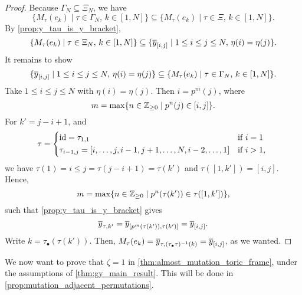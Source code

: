 \begin{proof}
	Because $\Gamma_N \subseteq \Xi_N$, we have
	\begin{equation*}
		\{M_\tau(e_k) \mid \tau \in \Gamma_N,\, k \in [1, N]\}
		\subseteq \{M_\tau(e_k) \mid \tau \in \Xi,\, k \in [1, N]\}.
	\end{equation*}
	By \cref{prop:y_tau_is_y_bracket},
	\begin{equation*}
		\{M_\tau(e_k) \mid \tau \in \Xi_N,\, k \in [1, N]\} \subseteq
		\{\overline{y}_{[i,j]} \mid 1 \leq i \leq j \leq N, \, \eta(i) = \eta(j)\}.
	\end{equation*}
	It remains to show
	\begin{equation*}
		\{\overline{y}_{[i,j]} \mid 1 \leq i \leq j \leq N, \, \eta(i) = \eta(j)\} \subseteq
		\{M_\tau(e_k) \mid \tau \in \Gamma_N,\, k \in [1, N]\}.
	\end{equation*}
	Take $1 \leq i \leq j \leq N$ with $\eta(i) = \eta(j)$. Then $i = p^m(j)$, where
	\begin{equation*}
		m = \max \{n \in \mathbb{Z}_{\geq 0} \mid p^n(j) \in [i, j]\}.
	\end{equation*}
	For $k' = j - i + 1$, and
	\begin{equation*}
		\tau = \begin{dcases*}
			\id = \tau_{1,1}                                                & if $i=1$    \\
			\tau_{i-1,j} = [i, \dots, j, i-1, j+1, \dots, N, i-2, \dots, 1] & if $i > 1$,
		\end{dcases*}
	\end{equation*}
	we have $\tau(1) = i \leq j = \tau(j - i + 1) = \tau(k')$ and $\tau([1, k']) = [i, j]$.
	Hence,
	\begin{equation*}
		m = \max\{n \in \mathbb{Z}_{\geq 0} \mid p^n(\tau(k')) \in \tau([1, k'])\},
	\end{equation*}
	such that \cref{prop:y_tau_is_y_bracket} gives
	\begin{equation*}
		\overline{y}_{\tau, k'} = \overline{y}_{[p^m(\tau(k')), \tau(k')]} = \overline{y}_{[i, j]}.
	\end{equation*}
	Write $k = \tau_\bullet(\tau(k'))$. Then, $M_\tau(e_k) = \overline{y}_{\tau,
			(\tau_\bullet\tau)^{-1}(k)} = \overline{y}_{[i,j]}$, as we wanted.
\end{proof}

We now want to prove that $\zeta = 1$ in \cref{thm:almost_mutation_toric_frame}, under
the assumptions of \cref{thm:gy_main_result}. This will be done in
\cref{prop:mutation_adjacent_permutations}.

